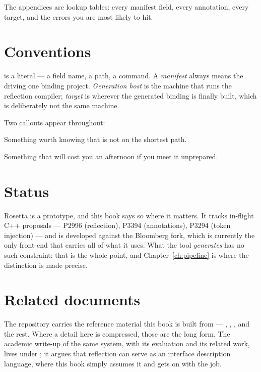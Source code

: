 The appendices are lookup tables: every manifest field, every annotation, every
target, and the errors you are most likely to hit.

\section*{Conventions}

 is a literal --- a field name, a path, a command. A
\emph{manifest} always means the  driving one binding
project. \emph{Generation host} is the machine that runs the reflection
compiler; \emph{target} is wherever the generated binding is finally built,
which is deliberately not the same machine.

Two callouts appear throughout:

\begin{note}
Something worth knowing that is not on the shortest path.
\end{note}

\begin{warn}
Something that will cost you an afternoon if you meet it unprepared.
\end{warn}

\section*{Status}

Rosetta is a prototype, and this book says so where it matters. It tracks
in-flight C++ proposals --- P2996 (reflection), P3394 (annotations), P3294
(token injection) --- and is developed against the Bloomberg
 fork, which is currently the only front-end that carries
all of what it uses. What the tool \emph{generates} has no such constraint:
that is the whole point, and Chapter~\ref{ch:pipeline} is where the distinction
is made precise.

\section*{Related documents}

The repository carries the reference material this book is built from ---
, ,
,  and the rest. Where a
detail here is compressed, those are the long form. The academic write-up of
the same system, with its evaluation and its related work, lives under
; it argues that reflection can serve as an interface description
language, where this book simply assumes it and gets on with the job.
